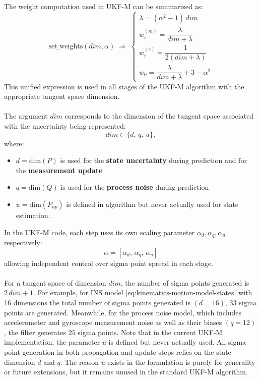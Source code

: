 \\ \\
The weight computation used in UKF-M can be summarized as:
$$
    \text{set\_weights}(dim, \alpha) \; \Rightarrow \;
    \begin{cases}
        \lambda = (\alpha^2 - 1)\,dim \\
        w_i^{(m)} = \dfrac{\lambda}{dim+\lambda} \\
        w_i^{(c)} = \dfrac{1}{2(dim+\lambda)} \\
        w_0 = \dfrac{\lambda}{dim+\lambda} + 3 - \alpha^2
    \end{cases}
$$
This unified expression is used in all stages of the UKF-M algorithm with the appropriate tangent space dimension.
\\ \\
The argument $dim$ corresponds to the dimension of the tangent space associated with the uncertainty being represented:
$$
    dim \in \{d,\, q,\, u\},
$$
where:
\begin{itemize}
    \item $d = \text{dim}(P)$ is used for the \textbf{state uncertainty} during prediction and for the \textbf{measurement update}
    \item $q = \text{dim}(Q)$ is used for the \textbf{process noise} during prediction
    \item $u = \text{dim}(P_{up})$ is defined in algorithm but never actually used for state estimation.
\end{itemize}
In the UKF-M code, each step uses its own scaling parameter $\alpha_d, \alpha_q, \alpha_u$ respectively:
$$
    \alpha = [\alpha_d,\, \alpha_q,\, \alpha_u]
$$
allowing independent control over sigma point spread in each stage.
\\ \\
For a tangent space of dimension $dim$, the number of sigma points generated is $2\,dim + 1$. For example, for INS model \ref{eq:kinematics-motion-model-states} with 16 dimensions the total number of sigma points generated is $(d=16)$, $33$ sigma points are generated. Meanwhile, for the process noise model, which includes accelerometer and gyroscope measurement noise as well as their biases $(q=12)$, the filter generates $25$ sigma points. Note that in the current UKF-M implementation, the parameter $u$ is defined but never actually used. All sigma point generation in both propagation and update steps relies on the state dimension $d$ and $q$. The reason $u$ exists in the formulation is purely for generality or future extensions, but it remains unused in the standard UKF-M algorithm.



